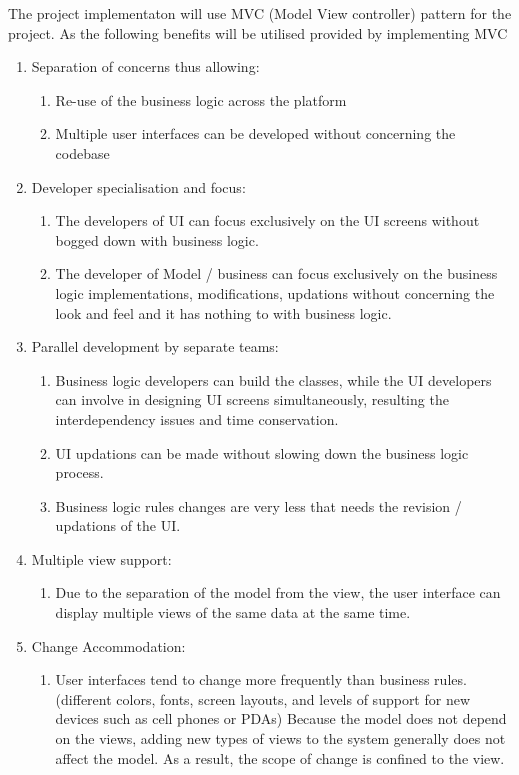 The project implementaton will use MVC (Model View controller) pattern for the project. As the following benefits will be utilised provided by implementing MVC
	\begin{enumerate}
		\item Separation of concerns thus allowing:
		\begin{enumerate}
			\item Re-use of the business logic across the platform 
			\item Multiple user interfaces can be developed without concerning the codebase
		\end{enumerate}
		
		\item Developer specialisation and focus:
		\begin{enumerate}
			\item The developers of UI can focus exclusively on the UI screens without bogged down with business logic.
			\item The developer of Model / business can focus exclusively on the business logic implementations, modifications, updations without concerning the look and feel and it has nothing to with business logic.
		\end{enumerate}
		
		\item Parallel development by separate teams:
		\begin{enumerate}
			\item Business logic developers can build the classes, while the UI developers can involve in designing UI screens simultaneously, resulting the interdependency issues and time conservation.
			\item UI updations can be made without slowing down the business logic process.
			\item Business logic rules changes are very less that needs the revision / updations of the UI.
		\end{enumerate}
		
		\item Multiple view support:
		\begin{enumerate}
			\item Due to the separation of the model from the view, the user interface can display multiple views of the same data at the same time.
		\end{enumerate}
		
		\item Change Accommodation:
		\begin{enumerate}
			\item User interfaces tend to change more frequently than business rules. (different colors, fonts, screen layouts, and levels of support for new 									devices such as cell phones or PDAs) Because the model does not depend on the views, adding new types of views to the system generally does not affect the model. As a result, the scope of change is confined to the view.
		\end{enumerate}
	\end{enumerate}